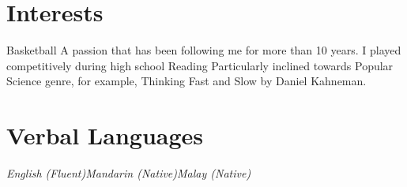 \documentclass{myresume2}
\begin{document}
\section{Interests}
%
\twocolumnEntry
  {Basketball}
  {A passion that has been following me for more than 10 years. I played competitively during high school}
\twocolumnEntry
  {Reading}
  {Particularly inclined towards Popular Science genre, for example, Thinking Fast and Slow by Daniel Kahneman.}
%
\section{Verbal Languages}
\textit{English (Fluent)\bigs Mandarin (Native)\bigs Malay (Native)}
%
\end{document}
